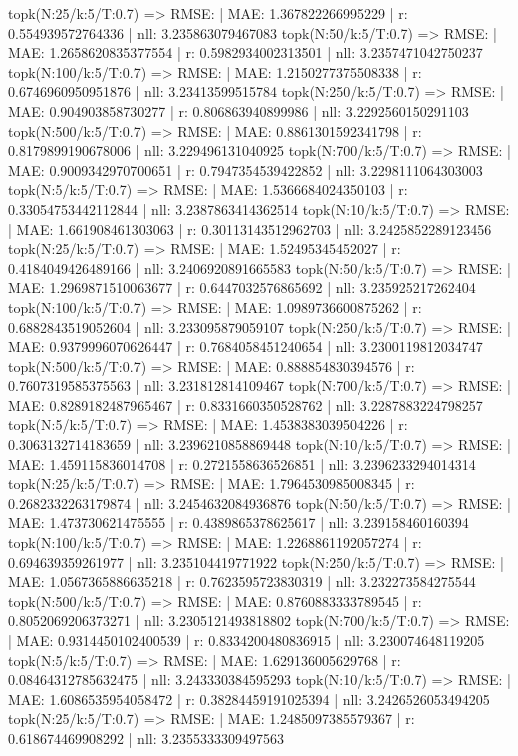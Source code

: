 topk(N:25/k:5/T:0.7) => RMSE: | MAE: 1.367822266995229 | r: 0.554939572764336 | nll: 3.235863079467083
topk(N:50/k:5/T:0.7) => RMSE: | MAE: 1.2658620835377554 | r: 0.5982934002313501 | nll: 3.2357471042750237
topk(N:100/k:5/T:0.7) => RMSE: | MAE: 1.2150277375508338 | r: 0.6746960950951876 | nll: 3.23413599515784
topk(N:250/k:5/T:0.7) => RMSE: | MAE: 0.904903858730277 | r: 0.806863940899986 | nll: 3.2292560150291103
topk(N:500/k:5/T:0.7) => RMSE: | MAE: 0.8861301592341798 | r: 0.8179899190678006 | nll: 3.229496131040925
topk(N:700/k:5/T:0.7) => RMSE: | MAE: 0.9009342970700651 | r: 0.7947354539422852 | nll: 3.2298111064303003
topk(N:5/k:5/T:0.7) => RMSE: | MAE: 1.5366684024350103 | r: 0.33054753442112844 | nll: 3.2387863414362514
topk(N:10/k:5/T:0.7) => RMSE: | MAE: 1.661908461303063 | r: 0.30113143512962703 | nll: 3.2425852289123456
topk(N:25/k:5/T:0.7) => RMSE: | MAE: 1.52495345452027 | r: 0.4184049426489166 | nll: 3.2406920891665583
topk(N:50/k:5/T:0.7) => RMSE: | MAE: 1.2969871510063677 | r: 0.6447032576865692 | nll: 3.235925217262404
topk(N:100/k:5/T:0.7) => RMSE: | MAE: 1.0989736600875262 | r: 0.6882843519052604 | nll: 3.233095879059107
topk(N:250/k:5/T:0.7) => RMSE: | MAE: 0.9379996070626447 | r: 0.7684058451240654 | nll: 3.2300119812034747
topk(N:500/k:5/T:0.7) => RMSE: | MAE: 0.888854830394576 | r: 0.7607319585375563 | nll: 3.231812814109467
topk(N:700/k:5/T:0.7) => RMSE: | MAE: 0.8289182487965467 | r: 0.8331660350528762 | nll: 3.2287883224798257
topk(N:5/k:5/T:0.7) => RMSE: | MAE: 1.4538383039504226 | r: 0.3063132714183659 | nll: 3.2396210858869448
topk(N:10/k:5/T:0.7) => RMSE: | MAE: 1.459115836014708 | r: 0.2721558636526851 | nll: 3.2396233294014314
topk(N:25/k:5/T:0.7) => RMSE: | MAE: 1.7964530985008345 | r: 0.2682332263179874 | nll: 3.2454632084936876
topk(N:50/k:5/T:0.7) => RMSE: | MAE: 1.473730621475555 | r: 0.4389865378625617 | nll: 3.239158460160394
topk(N:100/k:5/T:0.7) => RMSE: | MAE: 1.2268861192057274 | r: 0.694639359261977 | nll: 3.235104419771922
topk(N:250/k:5/T:0.7) => RMSE: | MAE: 1.0567365886635218 | r: 0.7623595723830319 | nll: 3.232273584275544
topk(N:500/k:5/T:0.7) => RMSE: | MAE: 0.8760883333789545 | r: 0.8052069206373271 | nll: 3.2305121493818802
topk(N:700/k:5/T:0.7) => RMSE: | MAE: 0.9314450102400539 | r: 0.8334200480836915 | nll: 3.230074648119205
topk(N:5/k:5/T:0.7) => RMSE: | MAE: 1.629136005629768 | r: 0.08464312785632475 | nll: 3.243330384595293
topk(N:10/k:5/T:0.7) => RMSE: | MAE: 1.6086535954058472 | r: 0.38284459191025394 | nll: 3.2426526053494205
topk(N:25/k:5/T:0.7) => RMSE: | MAE: 1.2485097385579367 | r: 0.618674469908292 | nll: 3.2355333309497563
